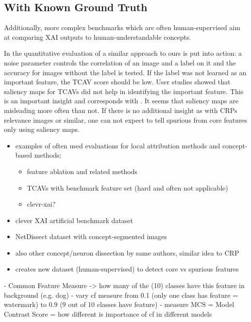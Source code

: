 \subsection{With Known Ground Truth}
Additionally, more complex benchmarks \cite{Kim2018, Arras2022, Bau2017, Singla2022} which are often human-supervised aim at comparing XAI outputs to human-understandable concepts.

In the quantitative evaluation of \cite{Kim2018} a similar approach to ours is put into action:
a noise parameter controls the correlation of an image and a label on it and the accuracy for images without the label is tested. If the label was not learned as an important feature, the TCAV score should be low. User studies showed that saliency maps for TCAVs did not help in identifying the important feature. This is an important insight and corresponds with \cite{Sixt2022a}. It seems that saliency maps are misleading more often than not. If there is no additional insight as with CRPs relevance images or similar, one can not expect to tell spurious from core features only using saliency maps.

\begin{itemize}
      \item examples of often used evaluations for local attribution methods and concept-based methods:
            \begin{itemize}
                  \item feature ablation and related methods
                  \item TCAVs \cite{Kim2018} with benchmark feature set (hard and often not applicable)
                  \item clevr-xai? \cite{Arras2022}
            \end{itemize}
      \item clever XAI artificial benchmark dataset \cite{Arras2022}
      \item NetDissect dataset with concept-segmented images \cite{Bau2017}
      \item also other concept/neuron dissection by same authors, similar idea to CRP \cite{Bau2020}
      \item creates new dataset (human-supervised) to detect core vs spurious features \cite{Singla2022}
\end{itemize}

\cite{Yang2019}
- Common Feature Measure -> how many of the (10) classes have this feature in background (e.g. dog)
- vary cf measure from 0.1 (only one class has feature = watermark) to 0.9 (9 out of 10 classes have feature)
- measure MCS = Model Contrast Score = how different is importance of cf in different models

